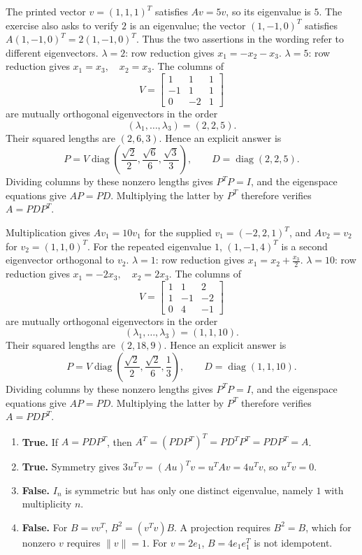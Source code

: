 The printed vector $v=(1,1,1)^T$ satisfies $Av=5v$, so its eigenvalue
is $5$. The exercise also asks to verify $2$ is an eigenvalue; the vector
$(1,-1,0)^T$ satisfies $A(1,-1,0)^T=2(1,-1,0)^T$.
Thus the two assertions in the wording refer to different eigenvectors.
$\lambda=2$: row reduction gives \(x_{1}=- x_{2} - x_{3}\).
$\lambda=5$: row reduction gives \(x_{1}=x_{3},\quad x_{2}=x_{3}\).
The columns of
\[
 V=\begin{bmatrix}1&1&1\\-1&1&1\\0&-2&1\end{bmatrix}
\]
are mutually orthogonal eigenvectors in the order
\[
 (\lambda_1,\ldots,\lambda_3)=(2,2,5).
\]
Their squared lengths are $(2,6,3)$. Hence an explicit answer is
\[
 P=V\operatorname{diag}(\frac{\sqrt{2}}{2},\frac{\sqrt{6}}{6},\frac{\sqrt{3}}{3}),\qquad
 D=\operatorname{diag}(2,2,5).
\]
Dividing columns by these nonzero lengths gives $P^TP=I$, and the
eigenspace equations give $AP=PD$. Multiplying the latter by $P^T$
therefore verifies $A=PDP^T$.

Multiplication gives $Av_1=10v_1$ for the supplied $v_1=(-2,2,1)^T$,
and $Av_2=v_2$ for $v_2=(1,1,0)^T$. For the repeated eigenvalue $1$,
$(1,-1,4)^T$ is a second eigenvector orthogonal to $v_2$.
$\lambda=1$: row reduction gives \(x_{1}=x_{2} + \frac{x_{3}}{2}\).
$\lambda=10$: row reduction gives \(x_{1}=- 2 x_{3},\quad x_{2}=2 x_{3}\).
The columns of
\[
 V=\begin{bmatrix}1&1&2\\1&-1&-2\\0&4&-1\end{bmatrix}
\]
are mutually orthogonal eigenvectors in the order
\[
 (\lambda_1,\ldots,\lambda_3)=(1,1,10).
\]
Their squared lengths are $(2,18,9)$. Hence an explicit answer is
\[
 P=V\operatorname{diag}(\frac{\sqrt{2}}{2},\frac{\sqrt{2}}{6},\frac{1}{3}),\qquad
 D=\operatorname{diag}(1,1,10).
\]
Dividing columns by these nonzero lengths gives $P^TP=I$, and the
eigenspace equations give $AP=PD$. Multiplying the latter by $P^T$
therefore verifies $A=PDP^T$.

\begin{enumerate}[label=(\alph*)]
\item \textbf{True.} If $A=PDP^T$, then
$A^T=(PDP^T)^T=PD^TP^T=PDP^T=A$.
\item \textbf{True.} Symmetry gives
$3u^Tv=(Au)^Tv=u^TAv=4u^Tv$, so $u^Tv=0$.
\item \textbf{False.} $I_n$ is symmetric but has only one distinct
eigenvalue, namely $1$ with multiplicity $n$.
\item \textbf{False.} For $B=vv^T$, $B^2=(v^Tv)B$.
A projection requires $B^2=B$, which for nonzero $v$ requires $\|v\|=1$.
For $v=2e_1$, $B=4e_1e_1^T$ is not idempotent.
\end{enumerate}

